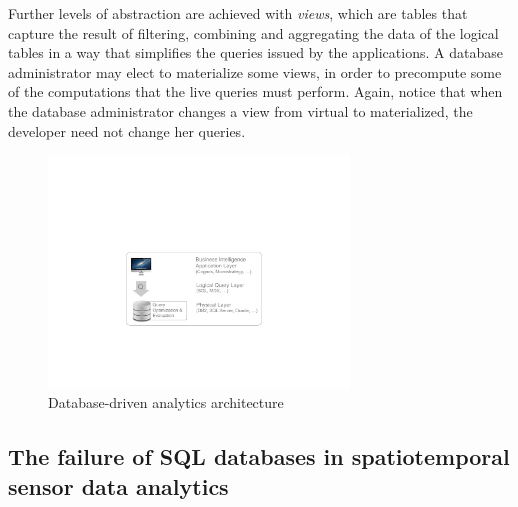 Further levels of abstraction are achieved with {\em views}, which are tables that capture the result of filtering, combining and aggregating the data of the logical tables in a way that simplifies the queries issued by the applications. A database administrator may elect to materialize some views, in order to precompute some of the computations that the live queries must perform. Again, notice that when the database administrator changes a view from virtual to materialized, the developer need not change her queries.

\begin{figure}
\center
\includegraphics[width=8cm]{fig-dbms.pdf}
\caption{Database-driven analytics architecture}
\label{fig:db-driven-arch}
\vspace*{-0.5cm}
\end{figure}

\subsection{The failure of SQL databases in spatiotemporal sensor data analytics}
\label{sec:the-failure}

